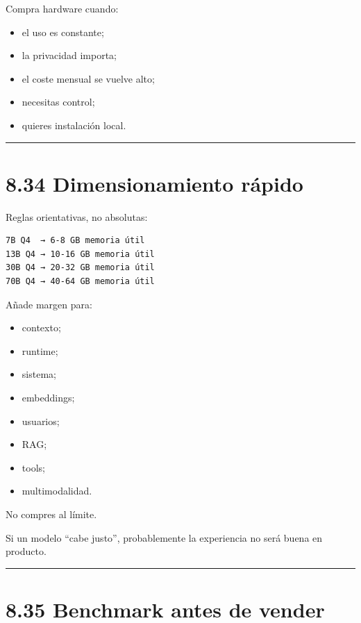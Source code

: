 Compra hardware cuando:

\begin{itemize}
\tightlist
\item
  el uso es constante;
\item
  la privacidad importa;
\item
  el coste mensual se vuelve alto;
\item
  necesitas control;
\item
  quieres instalación local.
\end{itemize}

\begin{center}\rule{0.5\linewidth}{0.5pt}\end{center}

\section{8.34 Dimensionamiento rápido}\label{dimensionamiento-ruxe1pido}

Reglas orientativas, no absolutas:

\begin{lstlisting}
7B Q4  → 6-8 GB memoria útil
13B Q4 → 10-16 GB memoria útil
30B Q4 → 20-32 GB memoria útil
70B Q4 → 40-64 GB memoria útil
\end{lstlisting}

Añade margen para:

\begin{itemize}
\tightlist
\item
  contexto;
\item
  runtime;
\item
  sistema;
\item
  embeddings;
\item
  usuarios;
\item
  RAG;
\item
  tools;
\item
  multimodalidad.
\end{itemize}

No compres al límite.

Si un modelo ``cabe justo'', probablemente la experiencia no será buena
en producto.

\begin{center}\rule{0.5\linewidth}{0.5pt}\end{center}

\section{8.35 Benchmark antes de
vender}\label{benchmark-antes-de-vender}

